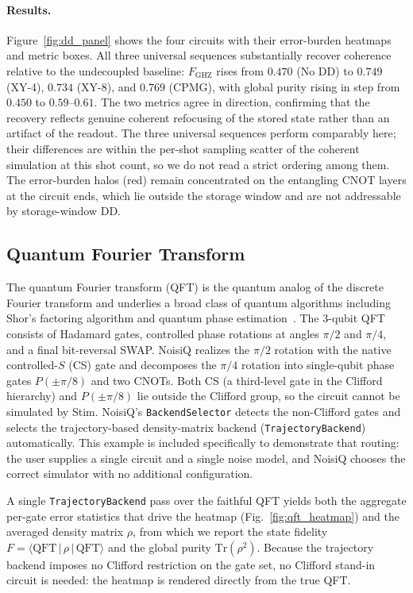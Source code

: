 \documentclass[10pt,twocolumn]{article}
\begin{document}
\paragraph{Results.}
Figure~\ref{fig:dd_panel} shows the four circuits with their error-burden
heatmaps and metric boxes. All three universal sequences substantially
recover coherence relative to the undecoupled baseline: $F_{\text{GHZ}}$
rises from $0.470$ (No DD) to $0.749$ (XY-4), $0.734$ (XY-8), and $0.769$
(CPMG), with global purity rising in step from $0.450$ to $0.59$--$0.61$.
The two metrics agree in direction, confirming that the recovery reflects
genuine coherent refocusing of the stored state rather than an artifact of
the readout. The three universal sequences perform comparably here; their
differences are within the per-shot sampling scatter of the coherent
simulation at this shot count, so we do not read a strict ordering among
them. The error-burden halos (red) remain concentrated on the entangling
CNOT layers at the circuit ends, which lie outside the storage window and
are not addressable by storage-window DD.

\subsection{Quantum Fourier Transform}
\label{subsec:qft}
The quantum Fourier transform (QFT) is the quantum analog of the
discrete Fourier transform and underlies a broad class of quantum
algorithms including Shor's factoring algorithm and quantum phase
estimation~\cite{nielsenchuang2000}.
The 3-qubit QFT consists of Hadamard gates, controlled phase
rotations at angles $\pi/2$ and $\pi/4$, and a final bit-reversal
SWAP. NoisiQ realizes the $\pi/2$ rotation with the native
controlled-$S$ (CS) gate and decomposes the $\pi/4$ rotation into
single-qubit phase gates $P(\pm\pi/8)$ and two CNOTs.
Both CS (a third-level gate in the Clifford hierarchy) and
$P(\pm\pi/8)$ lie outside the Clifford group, so the circuit cannot be
simulated by Stim. NoisiQ's \texttt{BackendSelector} detects the
non-Clifford gates and selects the trajectory-based density-matrix
backend (\texttt{TrajectoryBackend}) automatically. This example is
included specifically to demonstrate that routing: the user supplies a
single circuit and a single noise model, and NoisiQ chooses the
correct simulator with no additional configuration.

A single \texttt{TrajectoryBackend} pass over the faithful QFT yields
both the aggregate per-gate error statistics that drive the heatmap
(Fig.~\ref{fig:qft_heatmap}) and the averaged density matrix $\rho$,
from which we report the state fidelity
$F = \langle\text{QFT}\,|\,\rho\,|\,\text{QFT}\rangle$ and the global
purity $\text{Tr}(\rho^2)$. Because the trajectory backend imposes no
Clifford restriction on the gate set, no Clifford stand-in circuit is
needed: the heatmap is rendered directly from the true QFT.
\end{document}
